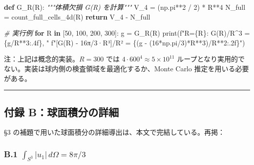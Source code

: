 \documentclass[
]{article}
\newenvironment{Shaded}{}{}
\newcommand{\BuiltInTok}[1]{\textcolor[rgb]{0.00,0.50,0.00}{#1}}
\newcommand{\CommentTok}[1]{\textcolor[rgb]{0.38,0.63,0.69}{\textit{#1}}}
\newcommand{\ControlFlowTok}[1]{\textcolor[rgb]{0.00,0.44,0.13}{\textbf{#1}}}
\newcommand{\DecValTok}[1]{\textcolor[rgb]{0.25,0.63,0.44}{#1}}
\newcommand{\KeywordTok}[1]{\textcolor[rgb]{0.00,0.44,0.13}{\textbf{#1}}}
\newcommand{\NormalTok}[1]{#1}
\newcommand{\OperatorTok}[1]{\textcolor[rgb]{0.40,0.40,0.40}{#1}}
\newcommand{\SpecialCharTok}[1]{\textcolor[rgb]{0.25,0.44,0.63}{#1}}
\newcommand{\SpecialStringTok}[1]{\textcolor[rgb]{0.73,0.40,0.53}{#1}}
\begin{document}
\begin{Shaded}
\begin{Highlighting}[]
\KeywordTok{def}\NormalTok{ G\_R(R):}
    \CommentTok{"""体積欠損 G(R) を計算"""}
\NormalTok{    V\_4 }\OperatorTok{=}\NormalTok{ (np.pi}\OperatorTok{**}\DecValTok{2} \OperatorTok{/} \DecValTok{2}\NormalTok{) }\OperatorTok{*}\NormalTok{ R}\OperatorTok{**}\DecValTok{4}
\NormalTok{    N\_full }\OperatorTok{=}\NormalTok{ count\_full\_cells\_4d(R)}
    \ControlFlowTok{return}\NormalTok{ V\_4 }\OperatorTok{{-}}\NormalTok{ N\_full}

\CommentTok{\# 実行例}
\ControlFlowTok{for}\NormalTok{ R }\KeywordTok{in}\NormalTok{ [}\DecValTok{50}\NormalTok{, }\DecValTok{100}\NormalTok{, }\DecValTok{200}\NormalTok{, }\DecValTok{300}\NormalTok{]:}
\NormalTok{    g }\OperatorTok{=}\NormalTok{ G\_R(R)}
    \BuiltInTok{print}\NormalTok{(}\SpecialStringTok{f"R=}\SpecialCharTok{\{}\NormalTok{R}\SpecialCharTok{\}}\SpecialStringTok{: G(R)/R\^{}3 = }\SpecialCharTok{\{}\NormalTok{g}\OperatorTok{/}\NormalTok{R}\OperatorTok{**}\DecValTok{3}\SpecialCharTok{:.4f\}}\SpecialStringTok{, "}
          \SpecialStringTok{f"[G(R) {-} 16π/3·R³]/R² = }\SpecialCharTok{\{}\NormalTok{(g }\OperatorTok{{-}}\NormalTok{ (}\DecValTok{16}\OperatorTok{*}\NormalTok{np.pi}\OperatorTok{/}\DecValTok{3}\NormalTok{)}\OperatorTok{*}\NormalTok{R}\OperatorTok{**}\DecValTok{3}\NormalTok{)}\OperatorTok{/}\NormalTok{R}\OperatorTok{**}\DecValTok{2}\SpecialCharTok{:.2f\}}\SpecialStringTok{"}\NormalTok{)}
\end{Highlighting}
\end{Shaded}

注：上記は概念的実装。\(R = 300\) では
\(4 \cdot 600^4 \approx 5 \times 10^{11}\)
ループとなり実用的でない。実装は球内側の検査領域を最適化するか、Monte
Carlo 推定を用いる必要がある。

\begin{center}\rule{0.5\linewidth}{0.5pt}\end{center}

\subsection{付録
B：球面積分の詳細}\label{ux4ed8ux9332-bux7403ux9762ux7a4dux5206ux306eux8a73ux7d30}

§3 の補題で用いた球面積分の詳細導出は、本文で完結している。再掲：

\subsubsection{\texorpdfstring{B.1
\(\int_{S^3} |u_1| \, d\Omega = 8\pi/3\)}{B.1 \textbackslash int\_\{S\^{}3\} \textbar u\_1\textbar{} \textbackslash, d\textbackslash Omega = 8\textbackslash pi/3}}\label{b.1-int_s3-u_1-domega-8pi3}
\end{document}
